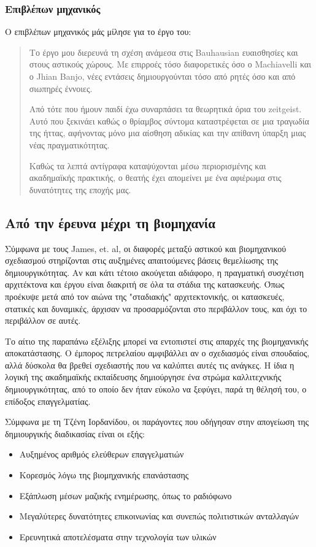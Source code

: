 \documentclass[12pt,a4paper]{extarticle}
\begin{document}
\subsubsection{Επιβλέπων μηχανικός}
Ο επιβλέπων μηχανικός μάς μίλησε για το έργο του:
\begin{quote}
	Το έργο μου διερευνά τη σχέση ανάμεσα στις Bauhausian ευαισθησίες και στους αστικούς χώρους.
	Με επιρροές τόσο διαφορετικές όσο ο Machiavelli και ο Jhian Banjo, νέες εντάσεις δημιουργούνται τόσο από ρητές όσο και από σιωπηρές έννοιες.
	
	Από τότε που ήμουν παιδί έχω συναρπάσει τα θεωρητικά όρια του zeitgeist. Αυτό που ξεκινάει καθώς ο θρίαμβος σύντομα καταστρέφεται σε μια τραγωδία της ήττας, αφήνοντας μόνο μια αίσθηση αδικίας και την απίθανη ύπαρξη μιας νέας πραγματικότητας.
	
	Καθώς τα λεπτά αντίγραφα καταψύχονται μέσω περιορισμένης και ακαδημαϊκής πρακτικής, ο θεατής έχει απομείνει με ένα αφιέρωμα στις δυνατότητες της εποχής μας.
\end{quote}

\subsection{Από την έρευνα μέχρι τη βιομηχανία}
Σύμφωνα με τους James, et. al, οι διαφορές μεταξύ αστικού και βιομηχανικού σχεδιασμού στηρίζονται στις αυξημένες απαιτούμενες βάσεις θεμελίωσης της δημιουργικότητας.
Αν και κάτι τέτοιο ακούγεται αδιάφορο, η πραγματική συσχέτιση αρχιτέκτονα και έργου είναι διακριτή σε όλα τα στάδια της κατασκευής. Όπως προέκυψε μετά από τον αιώνα
της "σταδιακής" αρχιτεκτονικής, οι κατασκευές, στατικές και δυναμικές, άρχισαν να προσαρμόζονται στο περιβάλλον τους, και όχι το περιβάλλον σε αυτές.

Το αίτιο της παραπάνω εξέλιξης μπορεί να εντοπιστεί στις απαρχές της βιομηχανικής αποκατάστασης. Ο έμπορος πετρελαίου αμφιβάλλει αν ο σχεδιασμός είναι σπουδαίος,
αλλά δύσκολα θα βρεθεί σχεδιαστής που να καλύπτει αυτές τις ανάγκες. Η ίδια η λογική της ακαδημαϊκής εκπαίδευσης δημιούργησε ένα στρώμα καλλιτεχνικής δημιουργικότητας,
από το οποίο δεν ήταν εύκολο να ξεφύγει, παρά τη θέλησή του, ο επίδοξος επαγγελματίας.

Σύμφωνα με τη Τζένη Ιορδανίδου, οι παράγοντες που οδήγησαν στην απογείωση της δημιουργικής διαδικασίας είναι οι εξής:
\begin{itemize}
	\item Αυξημένος αριθμός ελεύθερων επαγγελματιών
	\item Κορεσμός λόγω της βιομηχανικής επανάστασης
	\item Εξάπλωση μέσων μαζικής ενημέρωσης, όπως το ραδιόφωνο
	\item Μεγαλύτερες δυνατότητες επικοινωνίας και συνεπώς πολιτιστικών ανταλλαγών
	\item Ερευνητικά αποτελέσματα στην τεχνολογία των υλικών
\end{itemize}
\end{document}
